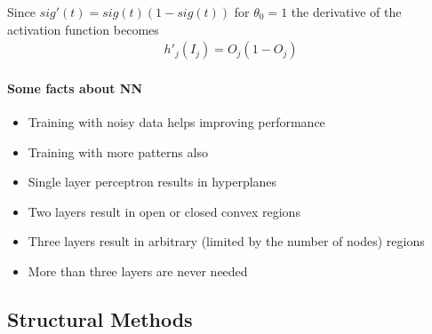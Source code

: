 Since $sig'(t) = sig(t)(1-sig(t))$ for $\theta_0=1$ the derivative of the activation function becomes
\begin{align*}
h'_j(I_j) = O_j(1-O_j)
\end{align*}

\paragraph{Some facts about NN}
\begin{itemize}
\item Training with noisy data helps improving performance
\item Training with more patterns also
\item Single layer perceptron results in hyperplanes
\item Two layers result in open or closed convex regions
\item Three layers result in arbitrary (limited by the number of nodes) regions
\item More than three layers are never needed
\end{itemize}

\subsection{Structural Methods}


